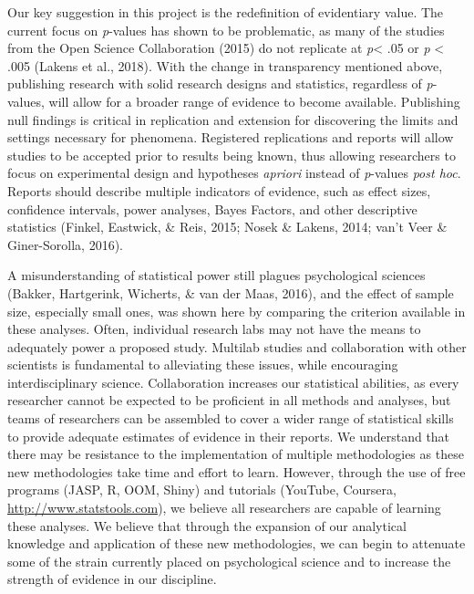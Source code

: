 \documentclass[,man, mask]{apa6}
\theoremstyle{definition}
\theoremstyle{definition}
\theoremstyle{definition}
\theoremstyle{remark}
\begin{document}
Our key suggestion in this project is the redefinition of evidentiary
value. The current focus on \emph{p}-values has shown to be problematic,
as many of the studies from the Open Science Collaboration (2015) do not
replicate at \emph{p}\textless{} .05 or \emph{p} \textless{} .005
(Lakens et al., 2018). With the change in transparency mentioned above,
publishing research with solid research designs and statistics,
regardless of \emph{p}-values, will allow for a broader range of
evidence to become available. Publishing null findings is critical in
replication and extension for discovering the limits and settings
necessary for phenomena. Registered replications and reports will allow
studies to be accepted prior to results being known, thus allowing
researchers to focus on experimental design and hypotheses
\emph{apriori} instead of \emph{p}-values \emph{post hoc}. Reports
should describe multiple indicators of evidence, such as effect sizes,
confidence intervals, power analyses, Bayes Factors, and other
descriptive statistics (Finkel, Eastwick, \& Reis, 2015; Nosek \&
Lakens, 2014; van't Veer \& Giner-Sorolla, 2016).

A misunderstanding of statistical power still plagues psychological
sciences (Bakker, Hartgerink, Wicherts, \& van der Maas, 2016), and the
effect of sample size, especially small ones, was shown here by
comparing the criterion available in these analyses. Often, individual
research labs may not have the means to adequately power a proposed
study. Multilab studies and collaboration with other scientists is
fundamental to alleviating these issues, while encouraging
interdisciplinary science. Collaboration increases our statistical
abilities, as every researcher cannot be expected to be proficient in
all methods and analyses, but teams of researchers can be assembled to
cover a wider range of statistical skills to provide adequate estimates
of evidence in their reports. We understand that there may be resistance
to the implementation of multiple methodologies as these new
methodologies take time and effort to learn. However, through the use of
free programs (JASP, R, OOM, Shiny) and tutorials (YouTube, Coursera,
\url{http://www.statstools.com}), we believe all researchers are capable
of learning these analyses. We believe that through the expansion of our
analytical knowledge and application of these new methodologies, we can
begin to attenuate some of the strain currently placed on psychological
science and to increase the strength of evidence in our discipline.
\end{document}
